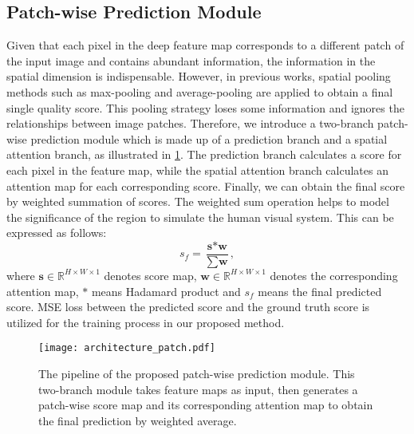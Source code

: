 \documentclass[10pt,twocolumn,letterpaper]{article}
\begin{document}
\subsection{Patch-wise Prediction Module}
\label{subsec:pooling}
Given that each pixel in the deep feature map corresponds to a different patch of the input image and contains abundant information, the information in the spatial dimension is indispensable. However, in previous works, spatial pooling methods such as max-pooling and average-pooling are applied to obtain a final single quality score. This pooling strategy loses some information and ignores the relationships between image patches. Therefore, we introduce a two-branch patch-wise prediction module which is made up of a prediction branch and a spatial attention branch, as illustrated in \cref{fig:pixel}. The prediction branch calculates a score for each pixel in the feature map, while the spatial attention branch calculates an attention map for each corresponding score. Finally, we can obtain the final score by weighted summation of scores. The weighted sum operation helps to model the significance of the region to simulate the human visual system. This can be expressed as follows:
\begin{equation}
    s_f = \frac{\textbf{s} * \textbf{w}}{\sum \textbf{w}},
\end{equation}
where $\textbf{s}\in \mathbb{R}^{H\times W \times 1}$ denotes score map, $\textbf{w}\in \mathbb{R}^{H\times W \times 1}$ denotes the corresponding attention map, $*$ means Hadamard product and $s_f$ means the final predicted score. MSE loss between the predicted score and the ground truth score is utilized for the training process in our proposed method.

\begin{figure}[th]
\centering
\texttt{[image: architecture\_patch.pdf]}
\caption{The pipeline of the proposed patch-wise prediction module. This two-branch module takes feature maps as input, then generates a patch-wise score map and its corresponding attention map to obtain the final prediction by weighted average.}
\label{fig:pixel}
\end{figure}
\end{document}
